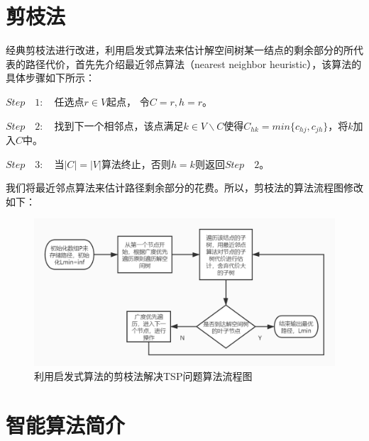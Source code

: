 \section{剪枝法}
经典剪枝法进行改进，利用启发式算法来估计解空间树某一结点的剩余部分的所代表的路径代价，首先先介绍最近邻点算法（nearest neighbor heuristic），该算法的具体步骤如下所示：
\par
$Step \quad 1: \quad $任选点$r \in V$起点， 令$C={r},h=r$。
\par
$Step \quad 2: \quad $找到下一个相邻点，该点满足$k \in V \backslash C $使得$C_{hk}=min\{c_{hj}, c_{jh}\}$，将$k$加入$C$中。
\par
$Step \quad 3: \quad $当$|C|=|V|$算法终止，否则$h=k$则返回$Step \quad 2$。
\par
我们将最近邻点算法来估计路径剩余部分的花费。所以，剪枝法的算法流程图修改如下：
\begin{figure}[H]
    \centering
    \includegraphics[width=13cm]{figure/qfsjzf.jpg}%
    \caption{利用启发式算法的剪枝法解决TSP问题算法流程图}
    \label{fig-qfsjzf}
\end{figure}
\section{智能算法简介}
